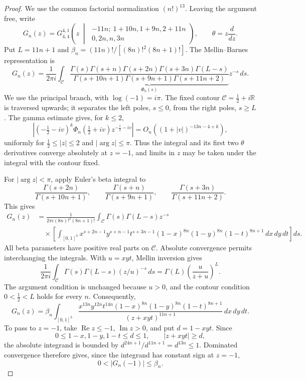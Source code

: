 \documentclass[oneside,english,11pt]{amsart}
\begin{document}
\begin{proof}
We use the common factorial normalization $(n!)^{13}$.
Leaving the argument free, write
\[
G_n(z)=G_{4,4}^{4,1}\!\left(
z\;\middle|\;
\begin{matrix}
-11n;\ 1+10n,1+9n,2+11n\\
0,2n,n,3n
\end{matrix}\right),
\qquad \theta=z\frac{d}{dz}.
\]
Put $L=11n+1$ and $\beta_n=(11n)!/[(8n)!^2(8n+1)!]$.
The Mellin--Barnes representation \cite[Eq.~16.17.1]{NIST:DLMF} is
\[
G_n(z)=\frac{1}{2\pi i}\int_{\mathcal C}
\underbrace{
\frac{\Gamma(s)\Gamma(s+n)\Gamma(s+2n)\Gamma(s+3n)\Gamma(L-s)}
     {\Gamma(s+10n+1)\Gamma(s+9n+1)\Gamma(s+11n+2)}
}_{\displaystyle\Phi_n(s)}z^{-s}\,ds.
\]
We use the principal branch, with $\log(-1)=i\pi$.
The fixed contour $\mathcal C=\tfrac12+i\mathbb R$ is traversed
upwards; it separates the left poles, $s\leq0$, from the right
poles, $s\geq L$. The gamma estimate
\cite[Eq.~5.11.9]{NIST:DLMF} gives, for $k\leq2$,
\[
\left|\left(-\tfrac12-iv\right)^k
\Phi_n(\tfrac12+iv)z^{-\frac12-iv}\right|
=O_n\!\left((1+|v|)^{-13n-4+k}\right),
\]
uniformly for $\tfrac12\leq|z|\leq2$ and $|\arg z|\leq\pi$.
Thus the integral and its first two $\theta$ derivatives converge
absolutely at $z=-1$, and limits in $z$ may be taken under the
integral with the contour fixed.

For $|\arg z|<\pi$, apply Euler's beta integral
\cite[Eq.~5.12.1]{NIST:DLMF} to
\[
\frac{\Gamma(s+2n)}{\Gamma(s+10n+1)},\qquad
\frac{\Gamma(s+n)}{\Gamma(s+9n+1)},\qquad
\frac{\Gamma(s+3n)}{\Gamma(s+11n+2)}.
\]
This gives
\[
\begin{aligned}
G_n(z)
&=\frac{1}{2\pi i(8n)!^2(8n+1)!}
\int_{\mathcal C}\Gamma(s)\Gamma(L-s)z^{-s}\\
&\quad\times\left[\int_{[0,1]^3}
x^{s+2n-1}y^{s+n-1}t^{s+3n-1}
(1-x)^{8n}(1-y)^{8n}(1-t)^{8n+1}
\,dx\,dy\,dt\right]ds.
\end{aligned}
\]
All beta parameters have positive real parts on $\mathcal C$.
Absolute convergence permits interchanging the integrals.
With $u=xyt$, Mellin inversion \cite[Eq.~5.13.1]{NIST:DLMF} gives
\[
\frac{1}{2\pi i}\int_{\mathcal C}
\Gamma(s)\Gamma(L-s)(z/u)^{-s}\,ds
=\Gamma(L)\left(\frac{u}{z+u}\right)^L.
\]
The argument condition is unchanged because $u>0$, and the contour
condition $0<\tfrac12<L$ holds for every $n$. Consequently,
\[
G_n(z)=\beta_n\int_{[0,1]^3}
\frac{x^{13n}y^{12n}t^{14n}
      (1-x)^{8n}(1-y)^{8n}(1-t)^{8n+1}}
     {(z+xyt)^{11n+1}}\,dx\,dy\,dt.
\]
To pass to $z=-1$, take $\operatorname{Re}z\leq-1$,
$\operatorname{Im}z>0$, and put $d=1-xyt$. Since
\[
0\leq1-x,1-y,1-t\leq d\leq1,\qquad |z+xyt|\geq d,
\]
the absolute integrand is bounded by
$d^{24n+1}/d^{11n+1}=d^{13n}\leq1$.
Dominated convergence therefore gives, since the integrand has
constant sign at $z=-1$,
\[
0<|G_n(-1)|\leq\beta_n.
\]


\end{proof}
\end{document}
